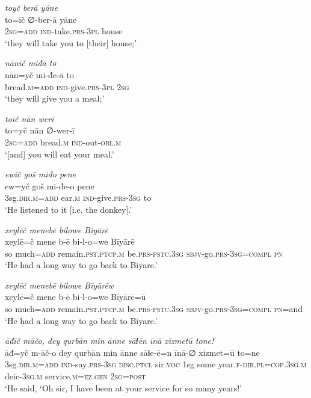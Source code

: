 \ea \label{HB.38}
\textit{toyč berā yāne} \\ 
\gll to=īč ∅-ber-ā yāne \\ 
 \textsc{2sg}\textsc{=add} \textsc{ind-}take\textsc{.prs}\textsc{-3pl} house \\ 
\glt `they will take you to [their] house;'
\z 
 
\ea \label{HB.40}
\textit{nānīč miđā to} \\ 
\gll nān=yč mi-đe-ā to \\ 
 bread\textsc{.m}\textsc{=add} \textsc{ind-}give\textsc{.prs}\textsc{-3pl} \textsc{2sg} \\ 
\glt `they will give you a meal;'
\z 
 
\ea \label{HB.41}
\textit{toīč nān werī} \\ 
\gll to=yč nān ∅-wer-ī \\ 
 \textsc{2sg}\textsc{=add} bread\textsc{.m} \textsc{ind-}out\textsc{-obl}\textsc{.m} \\ 
\glt `[and] you will eat your meal.'
\z 
 
\ea \label{HB.45}
\textit{ewīč goš miđo pene} \\ 
\gll ew=yč goš mi-đe-o pene \\ 
 3sg\textsc{.dir}\textsc{.m}\textsc{=add} ear\textsc{.m} \textsc{ind-}give\textsc{.prs}\textsc{-3sg} to \\ 
\glt `He listened to it [i.e. the donkey].'
\z 
 
\ea \label{HB.65}
\textit{xeylēč menebē bilowe Bīyārē} \\ 
\gll xeylē=č mene b-ē bi-l-o=we Bīyārē \\ 
 so much\textsc{=add} remain\textsc{.pst}\textsc{.ptcp}\textsc{.m} be\textsc{.prs}\textsc{-pstc}\textsc{.3sg} \textsc{sbjv-}go\textsc{.prs}\textsc{-3sg}\textsc{=\textsc{compl}} \textsc{pn} \\ 
\glt `He had a long way to go back to Biyare.'
\z 
 
\ea \label{HB.66}
\textit{xeylēč menebē bilowe Bīyārēw} \\ 
\gll xeylē=č mene b-ē bi-l-o=we Bīyārē=ū \\ 
 so much\textsc{=add} remain\textsc{.pst}\textsc{.ptcp}\textsc{.m} be\textsc{.prs}\textsc{-pstc}\textsc{.3sg} \textsc{sbjv-}go\textsc{.prs}\textsc{-3sg}\textsc{=\textsc{compl}} \textsc{pn}=and \\ 
\glt `He had a long way to go back to Biyare.'
\z 
 
\ea \label{HB.82}
\textit{āđīč māčo, dey qurbān min ānne sāɫēn īnā xizmetū tone!} \\ 
\gll āđ=yč m-āč-o dey qurbān min ānne sāɫe-ē=n īnā-∅ xizmet=ū to=ne \\ 
 3sg\textsc{.dir}\textsc{.m}\textsc{=add} \textsc{ind-}say\textsc{.prs}\textsc{-3sg} \textsc{disc.ptcl} sir.\textsc{voc} 1sg some year\textsc{\textsc{.f}}\textsc{-dir}\textsc{.pl}\textsc{=cop}\textsc{.3sg}\textsc{.m} deic\textsc{-3sg}\textsc{.m} service\textsc{.m}\textsc{=ez}\textsc{.gen} \textsc{2sg}\textsc{=\textsc{post}} \\ 
\glt `He said, ‘Oh sir, I have been at your service for so many years!'
\z 
 

